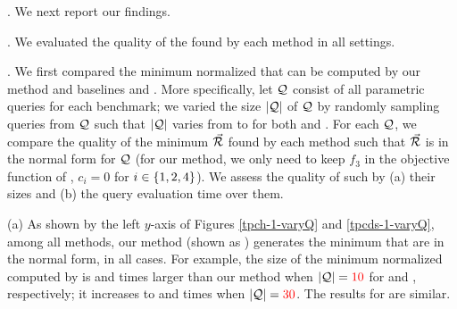 


. We next report our findings.










.
We evaluated the quality of the \bdss found by each method in %
all settings. 


. We first compared the minimum
normalized \bdss that can be computed by our method
and baselines \qcssel and \uscsel.
More specifically, 
let $\mathcal Q$ consist of all parametric queries for each benchmark;
we varied the size $|\mathcal Q|$ of $\mathcal Q$ by randomly sampling queries
from $\mathcal Q$ such that $|\mathcal Q|$ varies from  to  for both \tpch and \tpcds. For each $\mathcal Q$, we compare the quality of
the minimum \bds $\vec{{\mathcal R}}$ found by each method such that
$\vec{{\mathcal R}}$ is in the normal form for $\mathcal Q$ (for our method, we
only need to keep $f_{3}$ in the objective function of \opts,
\ie $c_{i} = 0$ for $i\allowbreak\in\allowbreak \{1,\allowbreak 2,\allowbreak 4\}$).
We assess the quality of such \bdss by (a) their sizes and (b) the
query evaluation time over them.

\sstab (a) As shown by the left $y$-axis of Figures
\ref{tpch-1-varyQ} and \ref{tpcds-1-varyQ}, 
among all methods, our method (shown as \opts)
generates the minimum \bdss that are in the normal
form,
in all cases. For example, the size of the
minimum normalized \bds computed by \warn{\uscsel} is
 and  times larger than our method
when $|\mathcal Q| = {\color{red}{10}}$ for \tpch
and \tpcds, respectively; it increases to  and  times when
$|\mathcal Q| = {\color{red}{30}}$.
The results for \qcssel are similar. %


